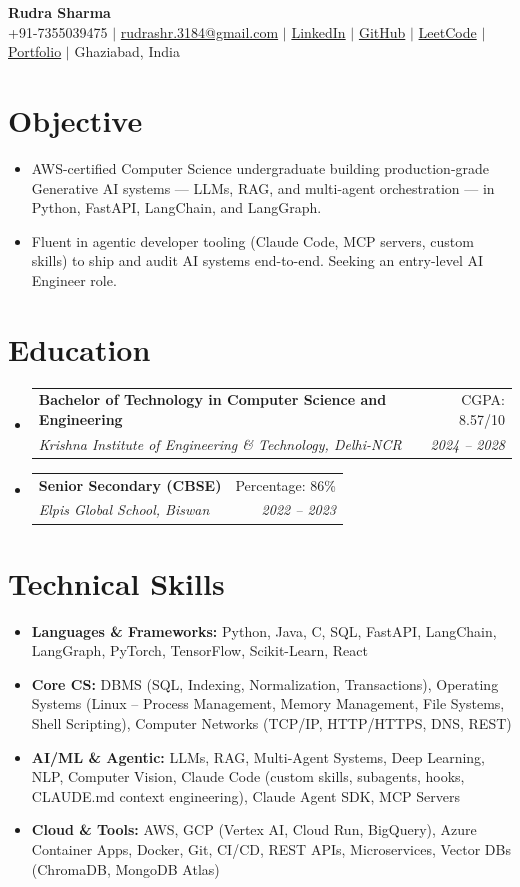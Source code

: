 \documentclass[letterpaper,11pt]{article}
\makeatletter
\newcommand{\resumeItem}[1]{\item\small{#1\vspace{-3pt}}}
\newcommand{\resumeSubheading}[4]{
  \vspace{-2pt}\item
    \begin{tabular*}{0.97\textwidth}[t]{l@{\extracolsep{\fill}}r}
      \small\textbf{#1} & \small #2 \\
      \textit{\small #3} & \textit{\small #4} \\
    \end{tabular*}\vspace{-6pt}}
\newcommand{\resumeSubHeadingListStart}{\begin{itemize}[leftmargin=0.1in,label={},itemsep=0pt]}
\newcommand{\resumeSubHeadingListEnd}{\end{itemize}\vspace{-6pt}}
\newcommand{\resumeItemListEnd}{\end{itemize}\vspace{-6pt}}
\makeatother
\begin{document}
\begin{center}
  {\Large \textbf{\textcolor{headingblue}{Rudra Sharma}}}\\[2pt]
  \small\color{headingblue}
  +91-7355039475 $|$
  \href{mailto:rudrashr.3184@gmail.com}{rudrashr.3184@gmail.com} $|$
  \href{https://linkedin.com/in/rudra-sharma-78628232b}{LinkedIn} $|$
  \href{https://github.com/RudyMontoo}{GitHub} $|$
  \href{https://leetcode.com/u/RudyMontoo/}{LeetCode} $|$
  \href{https://rudymontoo2713.lovable.app/}{Portfolio} $|$
  Ghaziabad, India
\end{center}

\vspace{-8pt}

\section{Objective}
\resumeSubHeadingListStart
  \resumeItem{AWS-certified Computer Science undergraduate building production-grade Generative AI systems --- LLMs, RAG, and multi-agent orchestration --- in Python, FastAPI, LangChain, and LangGraph.}
  \resumeItem{Fluent in agentic developer tooling (Claude Code, MCP servers, custom skills) to ship and audit AI systems end-to-end. Seeking an entry-level AI Engineer role.}
\resumeItemListEnd

\section{Education}
\resumeSubHeadingListStart
\resumeSubheading
{Bachelor of Technology in Computer Science and Engineering}{CGPA: 8.57/10}
{Krishna Institute of Engineering \& Technology, Delhi-NCR}{2024 -- 2028}
\resumeSubheading
{Senior Secondary (CBSE)}{Percentage: 86\%}
{Elpis Global School, Biswan}{2022 -- 2023}
\resumeSubHeadingListEnd

\section{Technical Skills}
\resumeSubHeadingListStart
  \resumeItem{\textbf{Languages \& Frameworks:} Python, Java, C, SQL, FastAPI, LangChain, LangGraph, PyTorch, TensorFlow, Scikit-Learn, React}
    \resumeItem{\textbf{Core CS:} DBMS (SQL, Indexing, Normalization, Transactions), Operating Systems (Linux -- Process Management, Memory Management, File Systems, Shell Scripting), Computer Networks (TCP/IP, HTTP/HTTPS, DNS, REST)}
  \resumeItem{\textbf{AI/ML \& Agentic:} LLMs, RAG, Multi-Agent Systems, Deep Learning, NLP, Computer Vision, Claude Code (custom skills, subagents, hooks, CLAUDE.md context engineering), Claude Agent SDK, MCP Servers}
  \resumeItem{\textbf{Cloud \& Tools:} AWS, GCP (Vertex AI, Cloud Run, BigQuery), Azure Container Apps, Docker, Git, CI/CD, REST APIs, Microservices, Vector DBs (ChromaDB, MongoDB Atlas)}
\resumeItemListEnd
\end{document}
